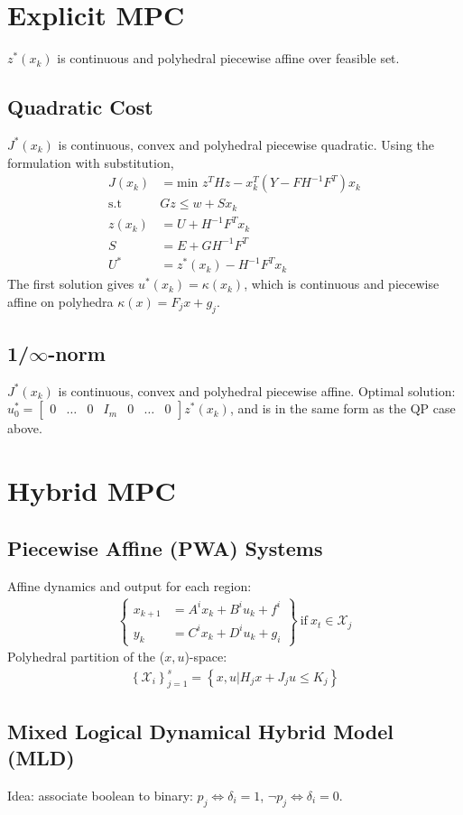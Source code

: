\documentclass[landscape,a4paper,8pt]{scrartcl}
\newcommand{\mc}[1]{\mathcal{#1}}
\newcommand{\Me}[1]{\begin{bmatrix}#1\end{bmatrix}} %
\newcommand{\Mg}[1]{\begin{Bmatrix}#1\end{Bmatrix}} %
\begin{document}
\begin{multicols*}{3}
\section{Explicit MPC}
$z^*(x_k)$ is continuous and polyhedral piecewise affine over feasible set.
\subsection{Quadratic Cost}
$J^*(x_k)$ is continuous, convex and polyhedral piecewise quadratic.
Using the formulation with substitution,
\begin{align*}
J(x_k) &= \text{min } z^T H z - x_k^T (Y - FH^{-1}F^T )x_k\\
\mathrm{s.t} \quad & Gz \le w +  Sx_k \\
	z(x_k) &= U + H^{-1} F^T x_k \\
	S &= E + G H^{-1} F^T \\
	U^* &= z^*(x_k) - H^{-1}F^Tx_k
\end{align*}
The first solution gives $u^*(x_k) = \kappa(x_k)$, which is continuous and piecewise affine on polyhedra $\kappa(x) = F_jx + g_j$.
\subsection{1/$\infty$-norm}
$J^*(x_k)$ is continuous, convex and polyhedral piecewise affine.
Optimal solution: $u^*_0 = \Me{0 & \dots & 0 & I_m & 0 & \dots & 0} z^*(x_k)$, and is in the same form as the QP case above.
\section{Hybrid MPC}
\subsection{Piecewise Affine (PWA) Systems}
Affine dynamics and output for each region:
\begin{align*}
\Mg{x_{k+1} &= A^i x_k + B^i u_k + f^i \\ y_k &= C^i x_k + D^i u_k + g_i} \mathrm{~if~} x_t \in \mc{X}_j
\end{align*}
Polyhedral partition of the ($x,u$)-space:
\begin{align*}
\left\{\mc{X}_i\right\}_{j=1}^s = \left\{x,u| H_j x + J_j u \leq K_j\right\}
\end{align*}

\subsection{Mixed Logical Dynamical Hybrid Model (MLD)}
Idea: associate boolean to binary: $ p_j \iff \delta_i = 1$, $\neg p_j \iff \delta_i =0$.

\end{multicols*}
\end{document}
